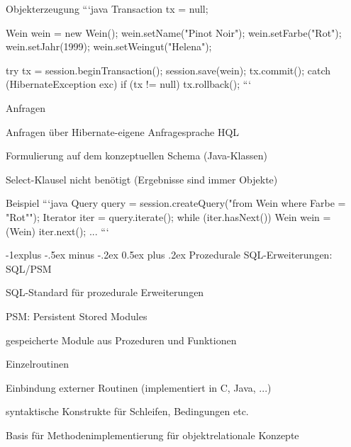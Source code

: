 \documentclass[a4paper]{article}
\makeatletter
\renewcommand{\subsection}{\@startsection{subsection}{2}{0mm}%
                                {-1explus -.5ex minus -.2ex}%
                                {0.5ex plus .2ex}%
                                {\normalfont\normalsize\bfseries}}
\makeatother
\begin{document}
\begin{multicols}{3}
    Objekterzeugung
    ```java
    Transaction tx = null;

    Wein wein = new Wein();
    wein.setName("Pinot Noir");
    wein.setFarbe("Rot");
    wein.setJahr(1999);
    wein.setWeingut("Helena");

    try {
            tx = session.beginTransaction();
            session.save(wein);
            tx.commit();
        } catch (HibernateException exc) {
            if (tx != null) tx.rollback();
        }
    ```

    Anfragen
    \begin{itemize*}
        \item Anfragen über Hibernate-eigene Anfragesprache HQL
        \item Formulierung auf dem konzeptuellen Schema (Java-Klassen)
        \item Select-Klausel nicht benötigt (Ergebnisse sind immer Objekte)
        \item Beispiel
        ```java
        Query query = session.createQuery("from Wein where Farbe = "Rot"");
        Iterator iter = query.iterate();
        while (iter.hasNext()) {
                Wein wein = (Wein) iter.next();
                ...
            }
        ```
    \end{itemize*}

    \subsection{Prozedurale SQL-Erweiterungen: SQL/PSM}
    \begin{itemize*}
        \item SQL-Standard für prozedurale Erweiterungen
        \item PSM: Persistent Stored Modules
        \begin{itemize*}
            \item gespeicherte Module aus Prozeduren und Funktionen
            \item Einzelroutinen
            \item Einbindung externer Routinen (implementiert in C, Java, ...)
            \item syntaktische Konstrukte für Schleifen, Bedingungen etc.
            \item Basis für Methodenimplementierung für objektrelationale Konzepte
        \end{itemize*}
    \end{itemize*}


\end{multicols}
\end{document}
